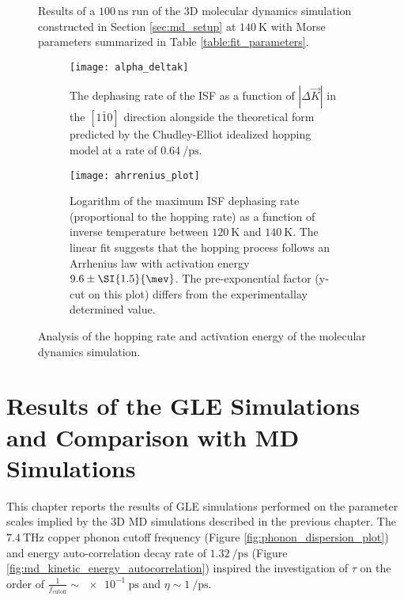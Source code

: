 \begin{figure}
	\caption{Results of a $\SI{100}{\nano\second}$ run of the 3D molecular dynamics simulation constructed in Section \ref{sec:md_setup} at $\SI{140}{\kelvin}$ with Morse parameters summarized in Table \ref{table:fit_parameters}.}
	\label{fig:md_results}
\end{figure}


\begin{figure}
	\begin{subfigure}{0.49\textwidth}
		\texttt{[image: alpha\_deltak]}
		\caption{The dephasing rate of the ISF as a function of $\left|\Delta{\vec{K}}\right|$ in the $\left[1\bar{1}0\right]$ direction alongside the theoretical form predicted by the Chudley-Elliot idealized hopping model \cite{Chudley_1961} at a rate of $\SI{0.64}{\per\pico\second}$.}
		\label{fig:alpha_deltak}
	\end{subfigure}
	\hfill	
	\begin{subfigure}{0.49\textwidth}
		\texttt{[image: ahrrenius\_plot]}
		\caption{Logarithm of the maximum ISF dephasing rate (proportional to the hopping rate) as a function of inverse temperature between $\SI{120}{\kelvin}$ and $\SI{140}{\kelvin}$. The linear fit suggests that the hopping process follows an Arrhenius law with activation energy $9.6\pm \SI{1.5}{\mev}$. The pre-exponential factor (y-cut on this plot) differs from the experimentallay determined value.}
		\label{fig:ahrrenius_plot}
	\end{subfigure}

	\caption{Analysis of the hopping rate and activation energy of the molecular dynamics simulation.}	
\end{figure}

\chapter{Results of the GLE Simulations and Comparison with MD Simulations}

This chapter reports the results of GLE simulations performed on the parameter scales implied by the 3D MD simulations described in the previous chapter. The $\SI{7.4}{\tera\hertz}$ copper phonon cutoff frequency (Figure \ref{fig:phonon_dispersion_plot}) and energy auto-correlation decay rate of $\SI{1.32}{\per\pico\second}$ (Figure \ref{fig:md_kinetic_energy_autocorrelation}) inspired the investigation of $\tau$ on the order of $\frac{1}{f_{\text{cutoff}}} \sim \SI{e-1}{\pico\second}$ and $\eta \sim \SI{1}{\per\pico\second}$.

